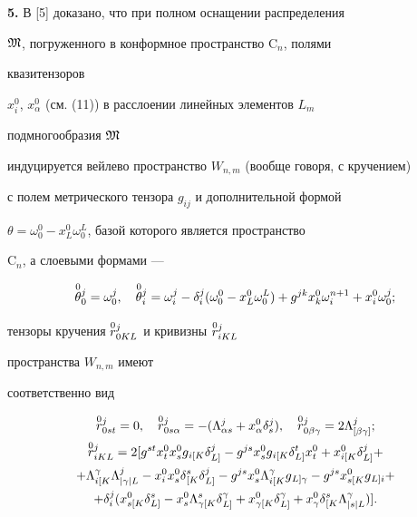  


{\bf 5.} В [5] доказано, что при полном оснащении распределения 


$\frak M$, погруженного в конформное пространство $\mathrm C_n$, полями 


квазитензоров 


$x^0_i$, $x^0_\alpha$ (см. (11)) в расслоении линейных элементов $L_m$ 


подмногообразия $\frak M$ 


индуцируется вейлево пространство $W_{n,m}$ (вообще говоря, с кручением) 


с полем метрического тензора $g_{i j}$ и дополнительной формой 


$\theta=\omega^0_0-x^0_L\omega^L_0$, базой которого является пространство 


$\mathrm C_n$, а слоевыми формами ---


\begin{equation} 


\up{0}{\theta}^j_0=\omega^j_0,\quad 


\up{0}{\theta}^j_i=\omega^j_i-\delta^j_i 


(\omega^0_0-x^0_L\omega^L_0)+g^{j k} 


x^0_k\omega^{n+1}_i+x^0_i\omega^j_0; 


\end{equation} 


тензоры кручения $\overset{0}{r}{}^j_{0K L}$ и кривизны $\overset{0}{r}{}^j_{i K L}$ 


пространства $W_{n,m}$ имеют 


соответственно вид 


\begin{gather} 


\up{0}{r}^j_{0 s t}=0,\quad \up{0}{r}^j_{0s\alpha}= 


-(\Lambda^j_{\alpha s}+x^0_\alpha\delta^j_s),\quad 


\up{0}{r}^j_{0\beta\gamma}=2\Lambda^j_{[\beta\gamma]};\\ 


\up{0}{r}^j_{i K L}=2[g^{s t}x^0_t x^0_s g{}_{i[K}\delta 


{}^j_{L]}-g^{j s}x^0_s g{}_{i[K}\delta{}^t_{L]} 


x^0_t+x{}^0_{i[K}\delta{}^j_{L]}+\notag \\ 


+\Lambda{}^\gamma_{i[K}\Lambda{}^j_{|\gamma|L}- 


x^0_i x^0_s \delta{}^s_{[K}\delta{}^j_{L]} 


-g^{j s}x^0_s\Lambda{}^\gamma_{i[K}g{}_{L]\gamma}- 


g^{j s}x{}^0_{s[K}g{}_{L]i}+\notag \\ 


+\delta^j_i(x{}^0_{s[K}\delta{}^s_{L]}-x^0_s 


\Lambda{}^s_{\gamma[K}\delta{}^\gamma_{L]}+ 


x{}^0_{\gamma[K}\delta{}^\gamma_{L]}+ 


x^0_\gamma\delta{}^s_{[K}\Lambda{}^\gamma_{|s|L})]. 


\end{gather} 


